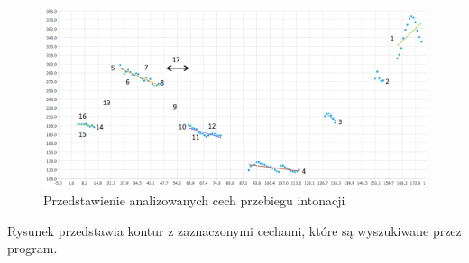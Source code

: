 \documentclass[a4paper,12 pt]{report}
\begin{document}
 \FloatBarrier
\begin{figure}[h]
\centering
\includegraphics[scale=0.7]{sztuczny_kontur.png}
\caption{Przedstawienie analizowanych cech przebiegu intonacji}
\end{figure}
\FloatBarrier
Rysunek przedstawia kontur z zaznaczonymi cechami, które są wyszukiwane przez program.
\end{document}
